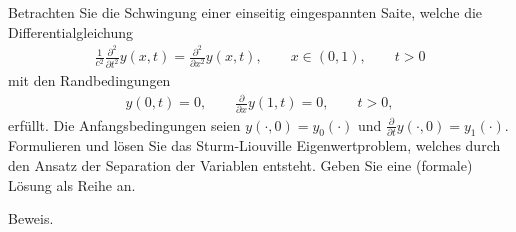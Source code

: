 \begin{exercise}
Betrachten Sie die Schwingung einer einseitig eingespannten Saite, welche die
Differentialgleichung
\begin{align*}
  \frac{1}{c^2}\frac{\partial^2}{\partial t ^2}y(x,t) = \frac{\partial^2}{\partial x^2}
  y(x,t), \qquad x \in (0,1), \qquad t > 0
\end{align*}
mit den Randbedingungen
\begin{align*}
  y(0,t) = 0, \qquad \frac{\partial}{\partial x}y(1,t) = 0, \qquad t > 0,
\end{align*}
erfüllt. Die Anfangsbedingungen seien $y(\cdot,0) = y_0(\cdot)$ und
$\frac{\partial}{\partial t}y(\cdot,0) = y_1(\cdot)$. Formulieren und lösen Sie
das Sturm-Liouville Eigenwertproblem, welches durch den Ansatz der Separation
der Variablen entsteht. Geben Sie eine (formale) Lösung als Reihe an.
\end{exercise}
\begin{solution}
Beweis.
\end{solution}
